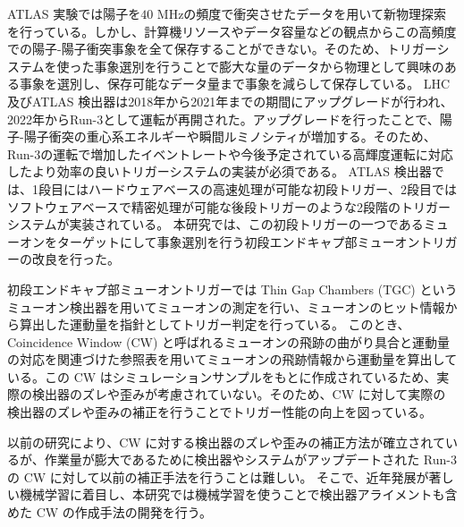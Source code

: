 ATLAS 実験では陽子を$40$ MHzの頻度で衝突させたデータを用いて新物理探索を行っている。しかし、計算機リソースやデータ容量などの観点からこの高頻度での陽子-陽子衝突事象を全て保存することができない。そのため、トリガーシステムを使った事象選別を行うことで膨大な量のデータから物理として興味のある事象を選別し、保存可能なデータ量まで事象を減らして保存している。
LHC及びATLAS 検出器は2018年から2021年までの期間にアップグレードが行われ、2022年からRun-3として運転が再開された。アップグレードを行ったことで、陽子-陽子衝突の重心系エネルギーや瞬間ルミノシティが増加する。そのため、Run-3の運転で増加したイベントレートや今後予定されている高輝度運転に対応したより効率の良いトリガーシステムの実装が必須である。
ATLAS 検出器では、1段目にはハードウェアベースの高速処理が可能な初段トリガー、2段目ではソフトウェアベースで精密処理が可能な後段トリガーのような2段階のトリガーシステムが実装されている。
本研究では、この初段トリガーの一つであるミューオンをターゲットにして事象選別を行う初段エンドキャプ部ミューオントリガーの改良を行った。

初段エンドキャプ部ミューオントリガーでは Thin Gap Chambers (TGC) というミューオン検出器を用いてミューオンの測定を行い、ミューオンのヒット情報から算出した運動量を指針としてトリガー判定を行っている。
このとき、 Coincidence Window (CW) と呼ばれるミューオンの飛跡の曲がり具合と運動量の対応を関連づけた参照表を用いてミューオンの飛跡情報から運動量を算出している。この CW はシミュレーションサンプルをもとに作成されているため、実際の検出器のズレや歪みが考慮されていない。そのため、CW に対して実際の検出器のズレや歪みの補正を行うことでトリガー性能の向上を図っている。

以前の研究により、CW に対する検出器のズレや歪みの補正方法が確立されているが、作業量が膨大であるために検出器やシステムがアップデートされた Run-3 の CW に対して以前の補正手法を行うことは難しい。
そこで、近年発展が著しい機械学習に着目し、本研究では機械学習を使うことで検出器アライメントも含めた CW の作成手法の開発を行う。



